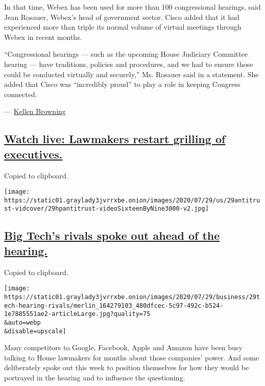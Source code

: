 In that time, Webex has been used for more than 100 congressional
hearings, said Jean Rosauer, Webex's head of government sector. Cisco
added that it had experienced more than triple its normal volume of
virtual meetings through Webex in recent months.

``Congressional hearings --- such as the upcoming House Judiciary
Committee hearing --- have traditions, policies and procedures, and we
had to ensure those could be conducted virtually and securely,'' Ms.
Rosauer said in a statement. She added that Cisco was ``incredibly
proud'' to play a role in keeping Congress connected.

--- \href{https://www.nytimes3xbfgragh.onion/by/kellen-browning}{Kellen
Browning}

\hypertarget{watch-live-lawmakers-restart-grilling-of-executives}{%
\subsection{\texorpdfstring{\protect\hyperlink{watch-live-lawmakers-restart-grilling-of-executives}{Watch
live: Lawmakers restart grilling of
executives.}}{Watch live: Lawmakers restart grilling of executives.}}\label{watch-live-lawmakers-restart-grilling-of-executives}}

Copied to clipboard.

\texttt{[image: https://static01.graylady3jvrrxbe.onion/images/2020/07/29/us/29antitrust-vidcover/29hpantitrust-videoSixteenByNine3000-v2.jpg]}

\hypertarget{big-techs-rivals-spoke-out-ahead-of-the-hearing}{%
\subsection{\texorpdfstring{\protect\hyperlink{big-techs-rivals-spoke-out-ahead-of-the-hearing}{Big
Tech's rivals spoke out ahead of the
hearing.}}{Big Tech's rivals spoke out ahead of the hearing.}}\label{big-techs-rivals-spoke-out-ahead-of-the-hearing}}

Copied to clipboard.

\texttt{[image: https://static01.graylady3jvrrxbe.onion/images/2020/07/29/business/29tech-hearing-rivals/merlin\_164279103\_480dfcec-5c97-492c-b524-1e7885551ae2-articleLarge.jpg?quality=75\\\&auto=webp\\\&disable=upscale]}

Many competitors to Google, Facebook, Apple and Amazon have been busy
talking to House lawmakers for months about those companies' power. And
some deliberately spoke out this week to position themselves for how
they would be portrayed in the hearing and to influence the questioning.

